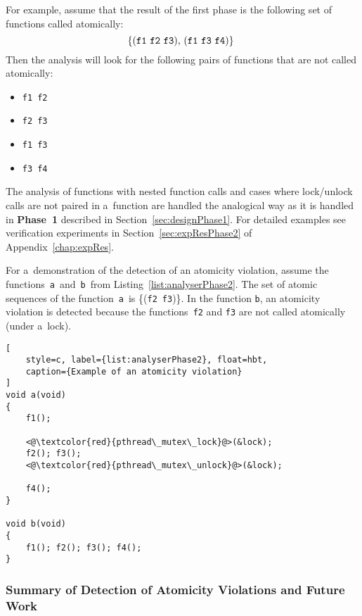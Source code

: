 \begin{example}
    For example, assume that the result of the first phase is the following
    set of functions called atomically:
    $$
        \text{%
            \{(\texttt{f1}~\texttt{f2}~\texttt{f3}),
            (\texttt{f1}~\texttt{f3}~\texttt{f4})\}
        }
    $$
    Then the analysis will look
    for the following pairs of functions that are not called atomically:
    \begin{itemize}
        \item \texttt{f1}~\texttt{f2}
        \item \texttt{f2}~\texttt{f3}
        \item \texttt{f1}~\texttt{f3}
        \item \texttt{f3}~\texttt{f4}
    \end{itemize}
\end{example}

The analysis of functions with nested function calls and cases
where lock/unlock calls are not paired in a~function are handled
the analogical way as it is handled in \textbf{Phase~1} described in
Section~\ref{sec:designPhase1}. For detailed examples see verification
experiments in Section~\ref{sec:expResPhase2} of Appendix~\ref{chap:expRes}.

\begin{example}
    For a~demonstration of the detection of an atomicity violation, assume
    the functions~\texttt{a}~and~\texttt{b}~from
    Listing~\ref{list:analyserPhase2}. The set of atomic sequences of the
    function~\texttt{a}~is \{(\texttt{f2}~\texttt{f3})\}. In the function
    \texttt{b}, an atomicity violation is detected because the
    functions~\texttt{f2} and \texttt{f3} are not called atomically (under
    a~lock).
\end{example}

\begin{lstlisting}[
    style=c, label={list:analyserPhase2}, float=hbt,
    caption={Example of an atomicity violation}
]
void a(void)
{
    f1();

    <@\textcolor{red}{pthread\_mutex\_lock}@>(&lock);
    f2(); f3();
    <@\textcolor{red}{pthread\_mutex\_unlock}@>(&lock);

    f4();
}

void b(void)
{
    f1(); f2(); f3(); f4();
}
\end{lstlisting}

\subsubsection{Summary of Detection of Atomicity Violations and Future Work}

